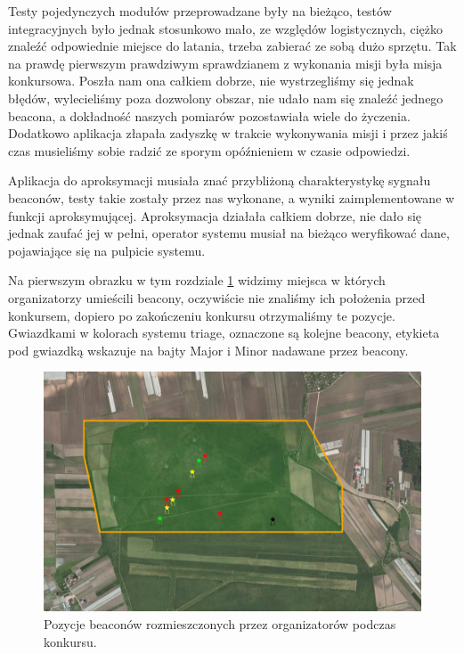 Testy pojedynczych modułów przeprowadzane były na bieżąco, testów integracyjnych było jednak stosunkowo mało, ze względów logistycznych, ciężko znaleźć odpowiednie miejsce do latania, trzeba zabierać ze sobą dużo sprzętu. Tak na prawdę pierwszym prawdziwym sprawdzianem z wykonania misji była misja konkursowa. Poszła nam ona całkiem dobrze, nie wystrzegliśmy się jednak błędów, wylecieliśmy poza dozwolony obszar, nie udało nam się znaleźć jednego beacona, a dokładność naszych pomiarów pozostawiała wiele do życzenia. Dodatkowo aplikacja złapała zadyszkę w trakcie wykonywania misji i przez jakiś czas musieliśmy sobie radzić ze sporym opóźnieniem w czasie odpowiedzi. 

Aplikacja do aproksymacji musiała znać przybliżoną charakterystykę sygnału beaconów, testy takie zostały przez nas wykonane, a wyniki zaimplementowane w funkcji aproksymującej. Aproksymacja działała całkiem dobrze, nie dało się jednak zaufać jej w pełni, operator systemu musiał na bieżąco weryfikować dane, pojawiające się na pulpicie systemu.

Na pierwszym obrazku w tym rozdziale \ref{fig:beaconykonkursowe} widzimy miejsca w których organizatorzy umieścili beacony, oczywiście nie znaliśmy ich położenia przed konkursem, dopiero po zakończeniu konkursu otrzymaliśmy te pozycje. Gwiazdkami w kolorach systemu triage, oznaczone są kolejne beacony, etykieta pod gwiazdką wskazuje na bajty Major i Minor nadawane przez beacony.

\begin{figure}[!th]
    \centering
    \includegraphics[width=15cm]{zalaczniki/obrazy/beacony_konkursowe.png}
    \caption{Pozycje beaconów rozmieszczonych przez organizatorów podczas konkursu.}
    \label{fig:beaconykonkursowe}
\end{figure}

